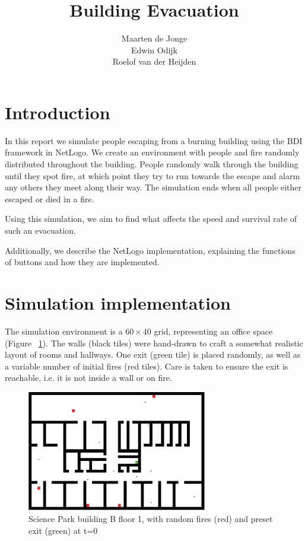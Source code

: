 \documentclass[a4paper]{article}
\title{Building Evacuation}
\author{Maarten de Jonge \\
        Edwin Odijk \\
        Roelof van der Heijden}
\begin{document}
\maketitle

\section{Introduction}
In this report we simulate people escaping from a burning building using the BDI framework in NetLogo. We create an environment with people and fire randomly distributed throughout the building. People randomly walk through the building until they spot fire, at which point they try to run towards the escape and alarm any others they meet along their way. The simulation ends when all people either escaped or died in a fire.

Using this simulation, we aim to find what affects the speed and survival rate of such an evacuation.

Additionally, we describe the NetLogo implementation, explaining the functions of buttons and how they are implemented.

\section{Simulation implementation}
\FloatBarrier
The simulation environment is a \(60\times 40\) grid, representing an office space (Figure~
\ref{fig:sp}). The walls (black tiles) were hand-drawn to craft a somewhat
realistic layout of rooms and hallways. One exit (green tile) is placed
randomly, as well as a variable number of initial fires (red tiles). Care is
taken to ensure the exit is reachable, i.e. it is not inside a wall or on fire.

\begin{figure}[h!]
  \centering
  \includegraphics[width=0.7\textwidth]{sp.png}
  \caption{Science Park building B floor 1, with random fires (red) and preset exit (green) at \(t=0\).}
  \caption{Science Park building B floor 1, with random fires (red) and preset exit (green) at t=0}  
  \label{fig:sp}
\end{figure}
\end{document}
